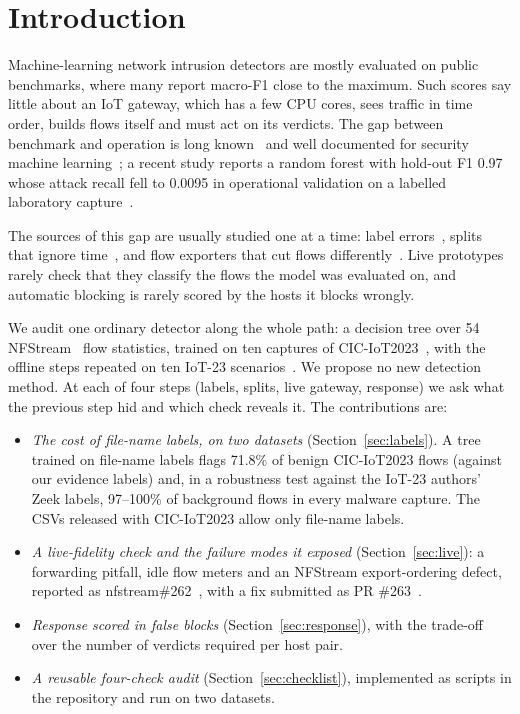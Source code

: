 \section{Introduction}\label{sec:intro}

Machine-learning network intrusion detectors are mostly evaluated on public benchmarks, where many report macro-F1 close to the maximum. Such scores say little about an IoT gateway, which has a few CPU cores, sees traffic in time order, builds flows itself and must act on its verdicts. The gap between benchmark and operation is long known~\cite{sommer2010outside} and well documented for security machine learning~\cite{arp2022dos,apruzzese2023sok}; a recent study reports a random forest with hold-out F1 0.97 whose attack recall fell to 0.0095 in operational validation on a labelled laboratory capture~\cite{tang2026hybrid}.

The sources of this gap are usually studied one at a time: label errors~\cite{engelen2021troubleshooting,liu2022error,flood2024smells}, splits that ignore time~\cite{pendlebury2019tesseract,arp2022dos}, and flow exporters that cut flows differently~\cite{pinto2025flowexporter,vitorino2025revisiting}. Live prototypes rarely check that they classify the flows the model was evaluated on, and automatic blocking is rarely scored by the hosts it blocks wrongly.

We audit one ordinary detector along the whole path: a decision tree over 54 NFStream~\cite{aouini2022nfstream} flow statistics, trained on ten captures of CIC-IoT2023~\cite{neto2023ciciot2023}, with the offline steps repeated on ten IoT-23 scenarios~\cite{garcia2020iot23}. We propose no new detection method. At each of four steps (labels, splits, live gateway, response) we ask what the previous step hid and which check reveals it. The contributions are:
\begin{itemize}
\item \emph{The cost of file-name labels, on two datasets} (Section~\ref{sec:labels}). A tree trained on file-name labels flags 71.8\% of benign CIC-IoT2023 flows (against our evidence labels) and, in a robustness test against the IoT-23 authors' Zeek labels, 97--100\% of background flows in every malware capture. The CSVs released with CIC-IoT2023 allow only file-name labels.
\item \emph{A live-fidelity check and the failure modes it exposed} (Section~\ref{sec:live}): a forwarding pitfall, idle flow meters and an NFStream export-ordering defect, reported as nfstream\#262~\cite{nfstream262}, with a fix submitted as PR \#263~\cite{nfstream263}.
\item \emph{Response scored in false blocks} (Section~\ref{sec:response}), with the trade-off over the number of verdicts required per host pair.
\item \emph{A reusable four-check audit} (Section~\ref{sec:checklist}), implemented as scripts in the repository and run on two datasets.
\end{itemize}
